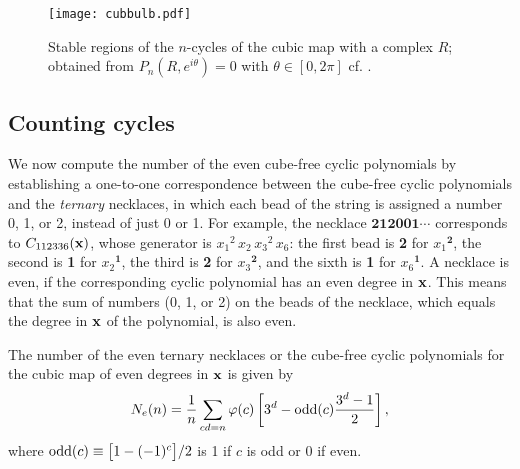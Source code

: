 \documentclass{ws-ijbc}
\begin{document}
\begin{figure}[h]
  \begin{minipage}{\linewidth}
    \begin{center}
        \texttt{[image: cubbulb.pdf]}
    \end{center}
  \end{minipage}%
  \caption{
  \label{fig:cubbulb}
  Stable regions of the $n$-cycles of the cubic map 
  with a complex $R$;
  obtained from $P_n(R, e^{i\theta}) = 0$ with $\theta \in [0, 2\pi]$
  cf. .
}
\end{figure}


\subsection{Counting cycles}

We now compute the number of the even cube-free cyclic polynomials
by establishing a one-to-one correspondence between
the cube-free cyclic polynomials and the \emph{ternary} necklaces,
in which each bead of the string is assigned a number
0, 1, or 2, instead of just 0 or 1.
%
For example, the necklace $\mathbf{212001\cdots}$
corresponds to $C_{112336}(\mathbf{x})$,
whose generator is
${x_1}^2 \, {x_2} \, {x_3}^2 \, x_6$:
the first bead is \textbf{2} for ${x_1}^\mathbf{2}$,
 the second is \textbf{1} for ${x_2}^\mathbf{1}$,
 the third is \textbf{2} for ${x_3}^\mathbf{2}$,
 and the sixth is \textbf{1} for ${x_6}^\mathbf{1}$.
%
A necklace is even,
if the corresponding cyclic polynomial has an even degree in $\mathbf{x}$.
%
This means that the sum of numbers (0, 1, or 2)
  on the beads of the necklace,
  which equals the degree in $\mathbf{x}$ of the polynomial, is also even.

%


\begin{theorem}
The number of the even ternary necklaces
or the cube-free cyclic polynomials for the cubic map of even degrees in $\mathbf{x}$
is given by
\begin{equation}
  N_e(n) = \frac{1}{n} \sum_{c d = n} \varphi(c)
    \left[
      3^d - \mathrm{odd}(c) \frac{3^d-1}{2}
    \right],
\label{eq:cubnecklace}
\end{equation}
where
$\mathrm{odd}(c) \equiv \big[1 - (-1)^c\big]/2$ is 1 if $c$ is odd or 0 if even.
\label{thm:cubnecklace}
\end{theorem}
\end{document}
